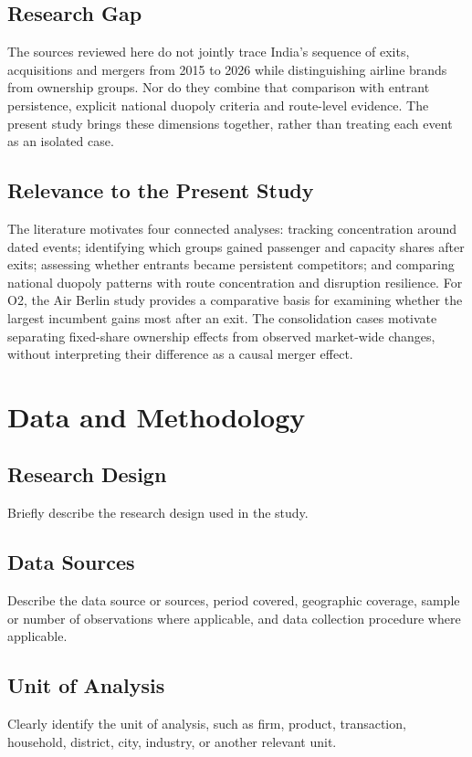 \documentclass[12pt,a4paper]{article}
\newenvironment{mycontribution}{\par\color{blue}\captionsetup{font+={color=blue}}}{\par}
\begin{document}
\begin{mycontribution}
\subsection{Research Gap}
The sources reviewed here do not jointly trace India's sequence of exits, acquisitions and mergers from 2015 to 2026 while distinguishing airline brands from ownership groups. Nor do they combine that comparison with entrant persistence, explicit national duopoly criteria and route-level evidence. The present study brings these dimensions together, rather than treating each event as an isolated case.

\subsection{Relevance to the Present Study}
The literature motivates four connected analyses: tracking concentration around dated events; identifying which groups gained passenger and capacity shares after exits; assessing whether entrants became persistent competitors; and comparing national duopoly patterns with route concentration and disruption resilience. For O2, the Air Berlin study provides a comparative basis for examining whether the largest incumbent gains most after an exit. The consolidation cases motivate separating fixed-share ownership effects from observed market-wide changes, without interpreting their difference as a causal merger effect.
\end{mycontribution}

\section{Data and Methodology}
\subsection{Research Design}
Briefly describe the research design used in the study.

\subsection{Data Sources}
Describe the data source or sources, period covered, geographic coverage, sample or number of observations where applicable, and data collection procedure where applicable.

\subsection{Unit of Analysis}
Clearly identify the unit of analysis, such as firm, product, transaction, household, district, city, industry, or another relevant unit.
\end{document}

